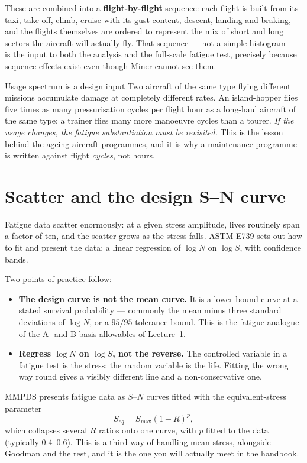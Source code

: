 \documentclass[11pt,a4paper]{article}
\begin{document}
These are combined into a \textbf{flight-by-flight} sequence: each flight is built from its taxi, take-off, climb, cruise with its gust content, descent, landing and braking, and the flights themselves are ordered to represent the mix of short and long sectors the aircraft will actually fly. That sequence --- not a simple histogram --- is the input to both the analysis and the full-scale fatigue test, precisely because sequence effects exist even though Miner cannot see them.

\begin{keybox}{Usage spectrum is a design input}
Two aircraft of the same type flying different missions accumulate damage at completely different rates. An island-hopper flies five times as many pressurisation cycles per flight hour as a long-haul aircraft of the same type; a trainer flies many more manoeuvre cycles than a tourer. \emph{If the usage changes, the fatigue substantiation must be revisited.} This is the lesson behind the ageing-aircraft programmes, and it is why a maintenance programme is written against flight \emph{cycles}, not hours.
\end{keybox}

\section{Scatter and the design S--N curve}

Fatigue data scatter enormously: at a given stress amplitude, lives routinely span a factor of ten, and the scatter grows as the stress falls. ASTM E739 sets out how to fit and present the data: a linear regression of $\log N$ on $\log S$, with confidence bands.

Two points of practice follow:
\begin{itemize}[nosep]
  \item \textbf{The design curve is not the mean curve.} It is a lower-bound curve at a stated survival probability --- commonly the mean minus three standard deviations of $\log N$, or a $95/95$ tolerance bound. This is the fatigue analogue of the A- and B-basis allowables of Lecture~1.
  \item \textbf{Regress $\log N$ on $\log S$, not the reverse.} The controlled variable in a fatigue test is the stress; the random variable is the life. Fitting the wrong way round gives a visibly different line and a non-conservative one.
\end{itemize}
MMPDS presents fatigue data as $S$--$N$ curves fitted with the equivalent-stress parameter
\begin{equation}
  S_{eq}=S_{\max}\left(1-R\right)^{p},
\end{equation}
which collapses several $R$ ratios onto one curve, with $p$ fitted to the data (typically 0.4--0.6). This is a third way of handling mean stress, alongside Goodman and the rest, and it is the one you will actually meet in the handbook.
\end{document}
